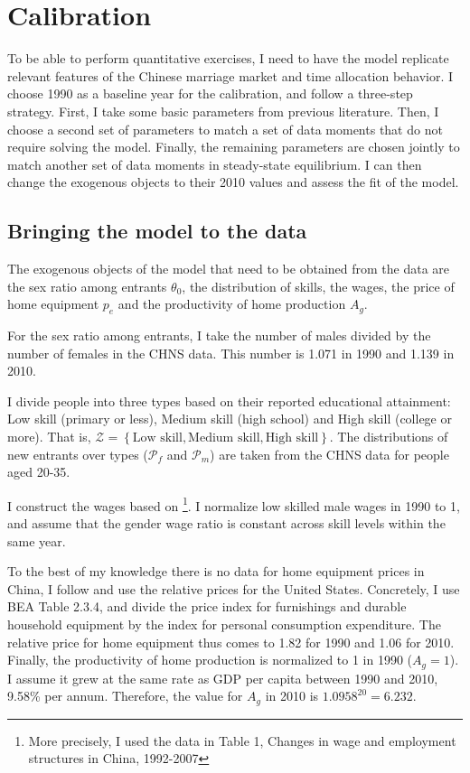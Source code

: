 \documentclass[12pt]{article}
\begin{document}
\section{Calibration} \label{sec:calibration}

To be able to perform quantitative exercises, I need to have the model replicate relevant features of the Chinese marriage market and time allocation behavior. I choose 1990 as a baseline year for the calibration, and follow a three-step strategy. First, I take some basic parameters from previous literature. Then, I choose a second set of parameters to match a set of data moments that do not require solving the model. Finally, the remaining parameters are chosen jointly to match another set of data moments in steady-state equilibrium. I can then change the exogenous objects to their 2010 values and assess the fit of the model. 

\subsection{Bringing the model to the data}

The exogenous objects of the model that need to be obtained from the data are the sex ratio among entrants $\theta_0$, the distribution of skills, the wages, the price of home equipment $p_e$ and the productivity of home production $A_g$. 

For the sex ratio among entrants, I take the number of males divided by the number of females in the CHNS data. This number is 1.071 in 1990 and 1.139 in 2010. 

I divide people into three types based on their reported educational attainment: Low skill (primary or less), Medium skill (high school) and High skill (college or more). That is, $\mathcal{Z}=\left\lbrace \text{Low skill},\text{Medium skill},\text{High skill}\right\rbrace$. The distributions of new entrants over types ($\mathcal{P}_f$ and $\mathcal{P}_m$) are taken from the CHNS data for people aged 20-35. 

I construct the wages based on \cite{getao14}\footnote{More precisely, I used the data in Table 1, Changes in wage and employment structures in China, 1992-2007}. I normalize low skilled male wages in 1990 to 1, and assume that the gender wage ratio is constant across skill levels within the same year. 

To the best of my knowledge there is no data for home equipment prices in China, I follow \cite{knowles13} and use the relative prices for the United States. Concretely, I use BEA Table 2.3.4\nocite{beatable}, and divide the price index for furnishings and durable household equipment by the index for personal consumption expenditure. The relative price for home equipment thus comes to 1.82 for 1990 and 1.06 for 2010. Finally, the productivity of home production is normalized to 1 in 1990 ($A_g=1$). I assume it grew at the same rate as GDP per capita between 1990 and 2010, 9.58\% per annum. Therefore, the value for $A_g$ in 2010 is $1.0958^{20}=6.232$.
\end{document}
